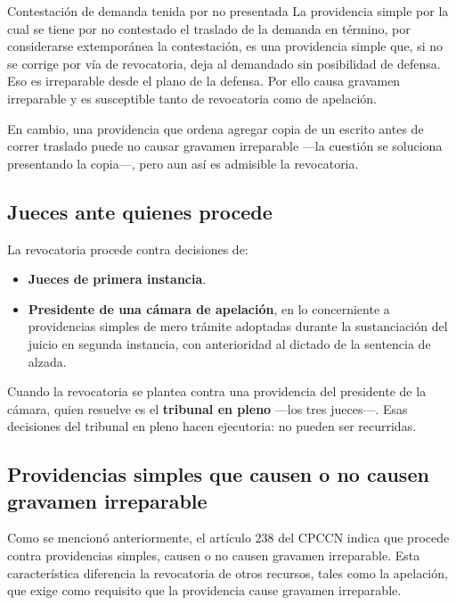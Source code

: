 \documentclass[12pt,oneside]{book}
\begin{document}
\begin{example}{Contestación de demanda tenida por no presentada}
La providencia simple por la cual se tiene por no contestado el traslado de la demanda en término, por considerarse extemporánea la contestación, es una providencia simple que, si no se corrige por vía de revocatoria, deja al demandado sin posibilidad de defensa. Eso es irreparable desde el plano de la defensa. Por ello causa gravamen irreparable y es susceptible tanto de revocatoria como de apelación.

En cambio, una providencia que ordena agregar copia de un escrito antes de correr traslado puede no causar gravamen irreparable ---la cuestión se soluciona presentando la copia---, pero aun así es admisible la revocatoria.
\end{example}

\subsection{Jueces ante quienes procede}

La revocatoria procede contra decisiones de:

\begin{itemize}
    \item \textbf{Jueces de primera instancia}.
    
    \item \textbf{Presidente de una cámara de apelación}, en lo concerniente a providencias simples de mero trámite adoptadas durante la sustanciación del juicio en segunda instancia, con anterioridad al dictado de la sentencia de alzada.
\end{itemize}

Cuando la revocatoria se plantea contra una providencia del presidente de la cámara, quien resuelve es el \textbf{tribunal en pleno} ---los tres jueces---. Esas decisiones del tribunal en pleno hacen ejecutoria: no pueden ser recurridas.

\subsection{Providencias simples que causen o no causen gravamen irreparable}

Como se mencionó anteriormente, el artículo 238 del CPCCN indica que procede contra providencias simples, causen o no causen gravamen irreparable. Esta característica diferencia la revocatoria de otros recursos, tales como la apelación, que exige como requisito que la providencia cause gravamen irreparable.
\end{document}
